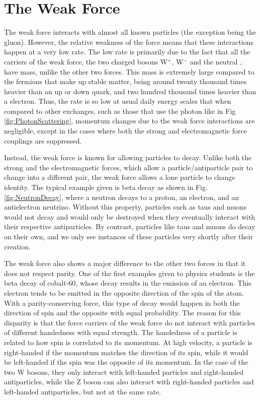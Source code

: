     
    
\section{The Weak Force}
	The weak force interacts with almost all known particles (the exception being the gluon). However, the relative weakness of the force means that these interactions happen at a very low rate. The low rate is primarily due to the fact that all the carriers of the weak force, the two charged bosons W$^+$, W$^-$ and the neutral \Z, have mass, unlike the other two forces. This mass is extremely large compared to the fermions that make up stable matter, being around twenty thousand times heavier than an up or down quark, and two hundred thousand times heavier than a electron. Thus, the rate is so low at usual daily energy scales that when compared to other exchanges, such as those that use the photon like in Fig \ref{fig:PhotonScattering}, momentum changes due to the weak force interactions are negligible, except in the cases where both the strong and electromagnetic force couplings are suppressed. 
	
	Instead, the weak force is known for allowing particles to decay. Unlike both the strong and the electromagnetic forces, which allow a particle/antiparticle pair to change into a different pair, the weak force allows a lone particle to change identity. The typical example given is beta decay as shown in Fig. \ref{fig:NeutronDecay}, where a neutron decays to a proton, an electron, and an antielectron neutrino. Without this property, particles such as taus and muons would not decay and would only be destroyed when they eventually interact with their respective antiparticles. By contrast, particles like taus and muons do decay on their own, and we only see instances of these particles very shortly after their creation.\par
    The weak force also shows a major difference to the other two forces in that it does not respect parity. One of the first examples given to physics students is the beta decay of cobalt-60, whose decay results in the emission of an electron. This electron tends to be emitted in the opposite direction of the spin of the atom. With a parity-conserving force, this type of decay would happen in both the direction of spin and the opposite with equal probability. The reason for this disparity is that the force carriers of the weak force do not interact with particles of different handedness with equal strength. The handedness of a particle is related to how spin is correlated to its momentum. At high velocity, a particle is right-handed if the momentum matches the direction of its spin, while it would be left-handed if the spin was the opposite of its momentum. In the case of the two W bosons, they only interact with left-handed particles and right-handed antiparticles, while the Z boson can also interact with right-handed particles and left-handed antiparticles, but not at the same rate. \par
    
